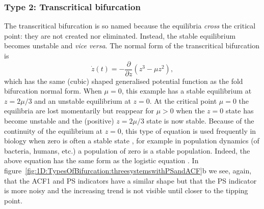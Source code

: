 {{	\subsubsection{Type 2: Transcritical bifurcation}
	The transcritical bifurcation is so named because the equilibria \emph{cross} the critical point: they are not created nor eliminated. Instead, the stable equilibrium becomes unstable and \emph{vice versa}. The normal form of the transcritical bifurcation is
	\begin{equation}
	\dot{z}(t) = -\frac{\partial }{\partial z}\left(z^3-\mu z^2\right),
	\label{eqn:1D:TypesOfBifurcation:transcritical}
	\end{equation}
	which has the same (cubic) shaped generalised potential function as the fold bifurcation normal form. When $\mu=0$, this example has a stable equilibrium at $z = 2\mu/3$ and an unstable equilibrium at $z=0$. At the critical point $\mu=0$ the equilibria are lost momentarily but reappear for $\mu>0$ when the $z=0$ state has become unstable and the (positive) $z = 2\mu/3$ state is now stable. Because of the continuity of the equilibrium at $z=0$, this type of equation is used frequently in biology when zero is often a stable state \citep{nicolis2007,strogatz2014}, for example in population dynamics (of bacteria, humans, etc.) a population of zero is a stable population. Indeed, the above equation has the same form as the logistic equation \citep{brown2018introduction}. In figure~\ref{fig:1D:TypesOfBifurcation:threesystemswithPSandACF}b we see, again, that the ACF1 and PS indicators have a similar shape but that the PS indicator is more noisy and the increasing trend is not visible until closer to the tipping point.
	
}}
